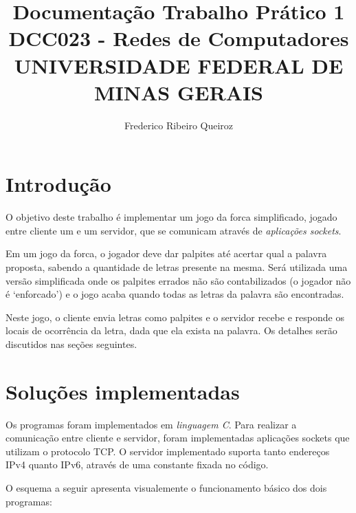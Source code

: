 \documentclass[12pt]{article}
\begin{document}
\title{%
    Documentação Trabalho Prático 1 \\
    \vspace{2em}
    \large DCC023 - Redes de Computadores \\
    UNIVERSIDADE FEDERAL DE MINAS GERAIS}

\author{Frederico Ribeiro Queiroz}
\maketitle

\section{Introdução}
O objetivo deste trabalho é implementar um jogo da forca simplificado, jogado entre cliente um
e um servidor, que se comunicam através de \emph{aplicações sockets}. \par
Em um jogo da forca, o jogador deve dar palpites até acertar qual a palavra proposta, sabendo a quantidade de letras presente na mesma.
Será utilizada uma versão simplificada onde os palpites errados não são contabilizados (o jogador não é `enforcado') e o jogo acaba quando todas as letras da palavra são encontradas. \par
Neste jogo, o cliente envia letras como palpites e o servidor recebe e responde os locais de ocorrência da letra, dada que ela exista na palavra. 
Os detalhes serão discutidos nas seções seguintes.

\section{Soluções implementadas}
Os programas foram implementados em \emph{linguagem C}. Para realizar a comunicação entre cliente e servidor, foram implementadas aplicações sockets que utilizam o protocolo TCP.
O servidor implementado suporta tanto endereços IPv4 quanto IPv6, através de uma constante fixada no código. \par
O esquema a seguir apresenta visualemente o funcionamento básico dos dois programas:
\end{document}
